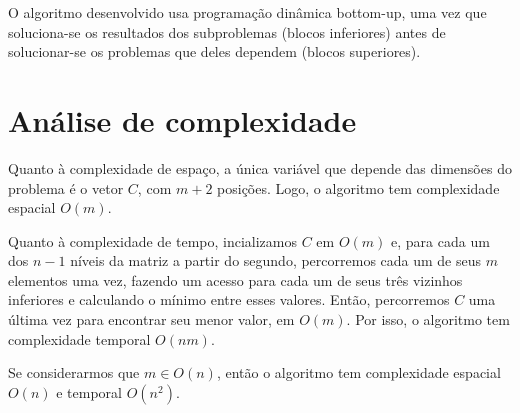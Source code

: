 \documentclass[12pt,a4paper]{article}
\begin{document}
  O algoritmo desenvolvido usa programação dinâmica bottom-up, uma vez que soluciona-se os resultados dos subproblemas (blocos inferiores) antes de solucionar-se os problemas que deles dependem (blocos superiores).

  \section{Análise de complexidade}
  Quanto à complexidade de espaço, a única variável que depende das dimensões do problema é o vetor $C$, com $m+2$ posições. Logo, o algoritmo tem complexidade espacial $O(m)$.

  Quanto à complexidade de tempo, incializamos $C$ em $O(m)$ e, para cada um dos $n-1$ níveis da matriz a partir do segundo, percorremos cada um de seus $m$ elementos uma vez, fazendo um acesso para cada um de seus três vizinhos inferiores e calculando o mínimo entre esses valores. Então, percorremos $C$ uma última vez para encontrar seu menor valor, em $O(m)$. Por isso, o algoritmo tem complexidade temporal $O(nm)$.

  Se considerarmos que $m \in O(n)$, então o algoritmo tem complexidade espacial $O(n)$ e temporal $O(n^2)$.
\end{document}
